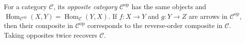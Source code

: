 
For a category $\mathcal C$, its \emph{opposite category} $\mathcal C^{\mathrm{op}}$ has the same objects and $\operatorname{Hom}_{\mathcal C^{\mathrm{op}}}(X,Y)=\operatorname{Hom}_{\mathcal C}(Y,X)$. If $f:X\to Y$ and $g:Y\to Z$ are arrows in $\mathcal C^{\mathrm{op}}$, then their composite in $\mathcal C^{\mathrm{op}}$ corresponds to the reverse-order composite in $\mathcal C$. Taking opposites twice recovers $\mathcal C$.
